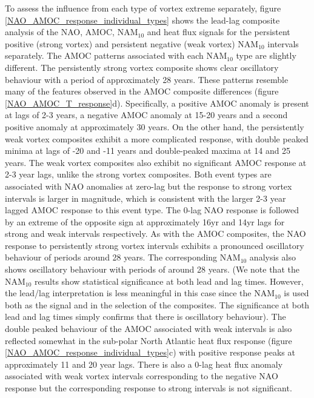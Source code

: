 To assess the influence from each type of vortex extreme separately, figure \ref{NAO_AMOC_response_individual_types} shows the lead-lag composite analysis of the NAO, AMOC, NAM$_{10}$ and heat flux signals for the persistent positive (strong vortex) and persistent negative (weak vortex) NAM$_{10}$ intervals separately. The AMOC patterns associated with each NAM$_{10}$ type are slightly different. The persistently strong vortex composite shows clear oscillatory behaviour with a period of approximately 28 years. These patterns resemble many of the features observed in the AMOC composite differences (figure \ref{NAO_AMOC_T_response}d). Specifically, a positive AMOC anomaly is present at lags of 2-3 years, a negative AMOC anomaly at 15-20 years and a second positive anomaly at approximately 30 years. On the other hand, the persistently weak vortex composites exhibit a more complicated response, with double peaked minima at lags of -20 and -11 years and double-peaked maxima at 14 and 25 years. The weak vortex composites also exhibit no significant AMOC response at 2-3 year lags, unlike the strong vortex composites. Both event types are associated with NAO anomalies at zero-lag but the response to strong vortex intervals is larger in magnitude, which is consistent with the larger 2-3 year lagged AMOC response to this event type. The 0-lag NAO response is followed by an extreme of the opposite sign at approximately 16yr and 14yr lags for strong and weak intervals respectively. As with the AMOC composites, the NAO response to persistently strong vortex intervals exhibits a pronounced oscillatory behaviour of periods around 28 years. The corresponding NAM$_{10}$ analysis also shows oscillatory behaviour with periods of around 28 years. (We note that the NAM$_{10}$ results  show statistical significance  at both lead and lag times. However, the lead/lag interpretation is less meaningful in this case since the NAM$_{10}$ is used both as the signal and in the selection of the composites. The significance at both lead and lag times simply confirms that there is oscillatory behaviour). The double peaked behaviour of the AMOC associated with weak intervals is also reflected somewhat in the sub-polar North Atlantic heat flux response (figure \ref{NAO_AMOC_response_individual_types}c) with positive response peaks at approximately 11 and 20 year lags. There is also a 0-lag heat flux anomaly associated with weak vortex intervals corresponding to the negative NAO response but the corresponding response to strong intervals is not significant. 

